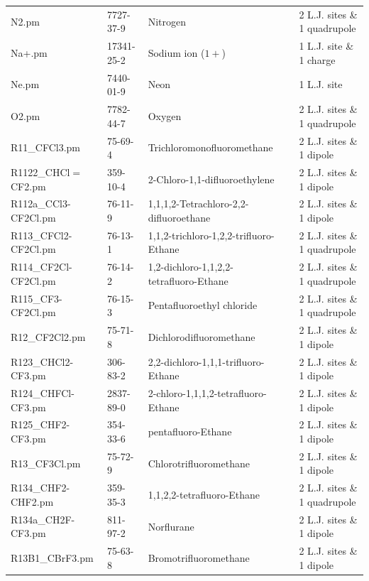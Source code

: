\begin{landscape}
\begin{longtable}{lllll}
	N2.pm & 7727-37-9 & Nitrogen & \parencite{Stoll2004} & 2 L.J. sites \& 1 quadrupole \\
	Na+.pm & 17341-25-2 & Sodium ion ($1+$) & \parencite{Reiser2014} & 1 L.J. site \& 1 charge \\
	Ne.pm & 7440-01-9 & Neon  & \parencite{Vrabec2001} & 1 L.J. site \\
	O2.pm & 7782-44-7 & Oxygen & \parencite{Stoll2004} & 2 L.J. sites \& 1 quadrupole \\
	R11\_CFCl3.pm & 75-69-4 & Trichloromonofluoromethane & \parencite{Stoll2003} & 2 L.J. sites \& 1 dipole \\
	R1122\_CHCl$=$CF2.pm & 359-10-4 & 2-Chloro-1,1-difluoroethylene & \parencite{Stoll2003} & 2 L.J. sites \& 1 dipole \\
	R112a\_CCl3-CF2Cl.pm & 76-11-9 & 1,1,1,2-Tetrachloro-2,2-difluoroethane & \parencite{Stoll2003} & 2 L.J. sites \& 1 dipole \\
	R113\_CFCl2-CF2Cl.pm & 76-13-1 & 1,1,2-trichloro-1,2,2-trifluoro-Ethane & \parencite{Stoll2003} & 2 L.J. sites \& 1 quadrupole \\
	R114\_CF2Cl-CF2Cl.pm & 76-14-2 & 1,2-dichloro-1,1,2,2-tetrafluoro-Ethane & \parencite{Stoll2003} & 2 L.J. sites \& 1 quadrupole \\
	R115\_CF3-CF2Cl.pm & 76-15-3 & Pentafluoroethyl chloride & \parencite{Stoll2003} & 2 L.J. sites \& 1 quadrupole \\
	R12\_CF2Cl2.pm & 75-71-8 & Dichlorodifluoromethane & \parencite{Stoll2003} & 2 L.J. sites \& 1 dipole \\
	R123\_CHCl2-CF3.pm & 306-83-2 &  2,2-dichloro-1,1,1-trifluoro-Ethane & \parencite{Stoll2003} & 2 L.J. sites \& 1 dipole \\
	R124\_CHFCl-CF3.pm & 2837-89-0 & 2-chloro-1,1,1,2-tetrafluoro-Ethane & \parencite{Stoll2003} & 2 L.J. sites \& 1 dipole \\
	R125\_CHF2-CF3.pm & 354-33-6 & pentafluoro-Ethane & \parencite{Stoll2003} & 2 L.J. sites \& 1 dipole \\
	R13\_CF3Cl.pm & 75-72-9 & Chlorotrifluoromethane & \parencite{Stoll2003} & 2 L.J. sites \& 1 dipole \\
	R134\_CHF2-CHF2.pm & 359-35-3 & 1,1,2,2-tetrafluoro-Ethane & \parencite{Stoll2003} & 2 L.J. sites \& 1 quadrupole \\
	R134a\_CH2F-CF3.pm & 811-97-2 & Norflurane & \parencite{Stoll2003} & 2 L.J. sites \& 1 dipole \\
	R13B1\_CBrF3.pm & 75-63-8 & Bromotrifluoromethane & \parencite{Stoll2003} & 2 L.J. sites \& 1 dipole \\

\end{longtable}
\end{landscape}

